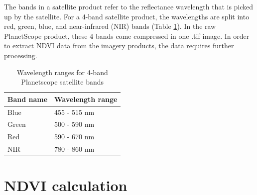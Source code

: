 \documentclass[12pt,twoside]{reedthesis}
\begin{document}
The bands in a satellite product refer to the reflectance wavelength that is picked up by the satellite. For a 4-band satellite product, the wavelengths are split into red, green, blue, and near-infrared (NIR) bands (Table \ref{tab:wavelength}). In the raw PlanetScope product, these 4 bands come compressed in one .tif image. In order to extract NDVI data from the imagery products, the data requires further processing.
\begin{longtable}[t]{ll}
\caption[4-band satellite wavelength ranges]{\label{tab:wavelength}Wavelength ranges for 4-band Planetscope satellite bands}\\
\toprule
Band name & Wavelength range\\
\midrule
Blue & 455 - 515 nm\\
Green & 500 - 590 nm\\
Red & 590 - 670 nm\\
NIR & 780 - 860 nm\\
\bottomrule
\end{longtable}
\hypertarget{ndvi-calculation}{%
\section{NDVI calculation}\label{ndvi-calculation}}
\end{document}
